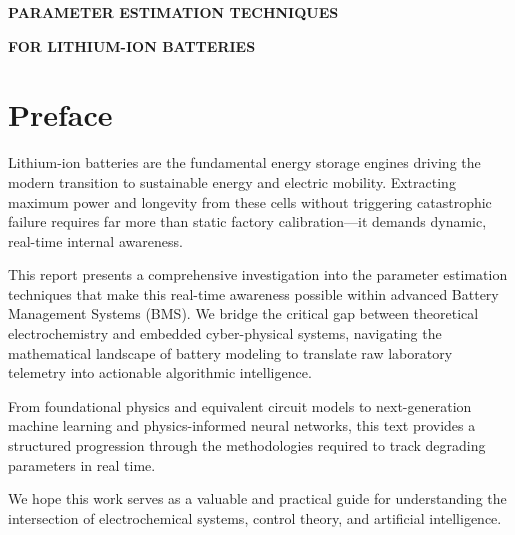 ﻿\documentclass[12pt]{report}
\begin{document}

\setcounter{page}{1}
\thispagestyle{plain}

\vspace*{7.5cm}

\begin{center}

{\Large\bfseries
PARAMETER ESTIMATION TECHNIQUES
}

\vspace{0.5cm}

{\Large\bfseries
FOR LITHIUM-ION BATTERIES
}

\end{center}

\newpage
\thispagestyle{empty}
\null
\newpage


\chapter*{Preface}


Lithium-ion batteries are the fundamental energy storage engines
driving the modern transition to sustainable energy and electric
mobility. Extracting maximum power and longevity from these cells
without triggering catastrophic failure requires far more than
static factory calibration—it demands dynamic, real-time internal
awareness.

This report presents a comprehensive investigation into the
parameter estimation techniques that make this real-time awareness
possible within advanced Battery Management Systems (BMS). We bridge
the critical gap between theoretical electrochemistry and embedded
cyber-physical systems, navigating the mathematical landscape of
battery modeling to translate raw laboratory telemetry into
actionable algorithmic intelligence.

From foundational physics and equivalent circuit models to
next-generation machine learning and physics-informed neural
networks, this text provides a structured progression through the
methodologies required to track degrading parameters in real time.

We hope this work serves as a valuable and practical guide for
understanding the intersection of electrochemical systems, control
theory, and artificial intelligence.
\end{document}
